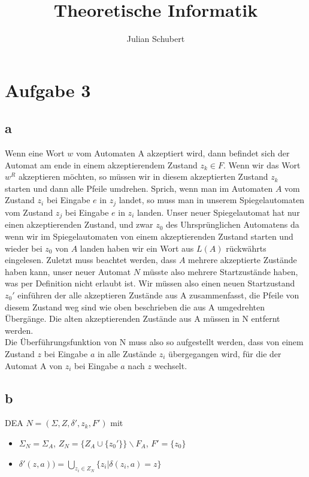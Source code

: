 \documentclass[14pt]{article}
\title{Theoretische Informatik}
\author{Julian Schubert}
\begin{document}
\section*{Aufgabe 3}
\subsection*{a}
Wenn eine Wort $w$ vom Automaten A akzeptiert wird, dann befindet sich der
Automat am ende in einem akzeptierendem Zustand $z_k \in F$. Wenn wir das 
Wort $w^R$ akzeptieren möchten, so müssen wir in diesem akzeptierten 
Zustand $z_k$ starten und dann alle Pfeile umdrehen. Sprich, wenn man 
im Automaten $A$ vom Zustand $z_i$ bei Eingabe $e$ in $z_j$ landet, so
muss man in unserem Spiegelautomaten vom Zustand $z_j$ bei Eingabe $e$
in $z_i$ landen. Unser neuer Spiegelautomat hat nur einen akzeptierenden
Zustand, und zwar $z_0$ des Uhrsprünglichen Automatens da wenn wir im
Spiegelautomaten von einem akzeptierenden Zustand starten und wieder bei
$z_0$ von $A$ landen haben wir ein Wort aus $L(A)$ rückwährts eingelesen.
Zuletzt muss beachtet werden, dass $A$ mehrere akzeptierte Zustände haben kann,
unser neuer Automat $N$ müsste also mehrere Startzustände haben, was per
Definition nicht erlaubt ist. Wir müssen also einen neuen Startzustand $z_0'$
einführen der alle akzeptieren Zustände aus A zusammenfasst, die Pfeile 
von diesem Zustand weg sind wie oben beschrieben die aus A umgedrehten
Übergänge. Die alten akzeptierenden Zustände aus A müssen in N entfernt
werden. \\
Die Überführungsfunktion von N muss also so aufgestellt werden, dass von einem 
Zustand $z$ bei Eingabe $a$ in alle Zustände $z_i$ übergegangen wird, für 
die der Automat A von $z_i$ bei Eingabe $a$ nach $z$ wechselt.
\subsection*{b}
DEA $N = (\varSigma, Z, \delta', z_k, F')$ mit
\begin{itemize}
    \item $\varSigma_N = \varSigma_A$, $Z_N = \{Z_A \cup \{z_0'\}\} \backslash F_A$, $F' = \{ z_0 \}$
    \item $\delta'(z, a)) = \bigcup_{z_i \in Z_N} \{ z_i | \delta(z_i, a) = z \}$
\end{itemize}
\end{document}

